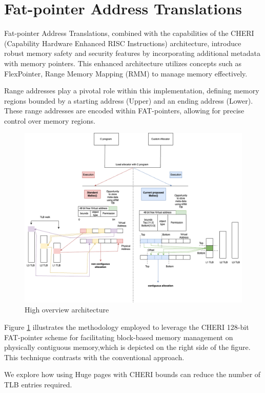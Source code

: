 \documentclass[11pt]{article}
\author{Akilan}
\date{\today}
\title{}
\begin{document}
\tableofcontents


\section{Fat-pointer Address Translations}
\label{sec:org9194085}

Fat-pointer Address Translations, combined with the capabilities of the CHERI (Capability Hardware Enhanced RISC Instructions) 
architecture, introduce robust memory safety and security features by incorporating additional metadata 
with memory pointers. This enhanced architecture utilizes concepts such as FlexPointer, 
Range Memory Mapping (RMM) to manage memory effectively.

Range addresses play a pivotal role within this implementation, defining memory 
regions bounded by a starting address (Upper) and an ending address (Lower). 
These range addresses are encoded within FAT-pointers, allowing for precise 
control over memory regions.

\begin{figure}[htbp]
\centering
\includegraphics[width=.9\linewidth]{diagram/HighOverviewArchitecture.drawio.png}
\caption{\label{fig:orgcb94e61}High overview architecture}
\end{figure}

Figure \ref{fig:orgcb94e61} illustrates
the methodology employed to leverage the CHERI 
128-bit FAT-pointer scheme for facilitating
block-based memory management on physically
contiguous memory,which is depicted on the
right side of the figure. 
This technique contrasts with the
conventional approach.

We explore how using Huge pages
with CHERI bounds can reduce the
number of TLB entries required. 
\end{document}

